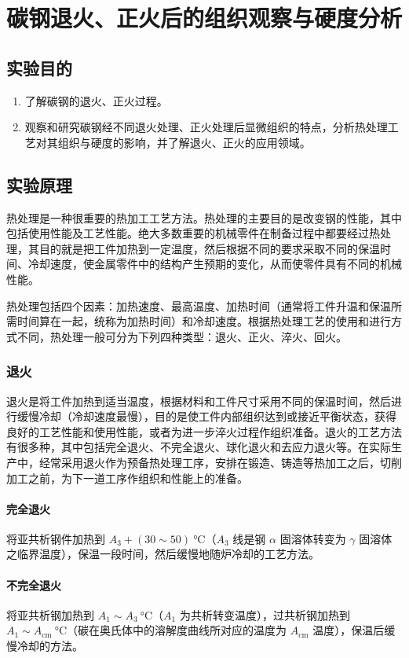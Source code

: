 \chapter{碳钢退火、正火后的组织观察与硬度分析}
\section{实验目的}
    \begin{enumerate}
        \item 了解碳钢的退火、正火过程。
        \item 观察和研究碳钢经不同退火处理、正火处理后显微组织的特点，分析热处理工艺对其组织与硬度的影响，并了解退火、正火的应用领域。
    \end{enumerate}
\section{实验原理}%
    热处理是一种很重要的热加工工艺方法。热处理的主要目的是改变钢的性能，其中包括使用性能及工艺性能。绝大多数重要的机械零件在制备过程中都要经过热处理，其目的就是把工件加热到一定温度，然后根据不同的要求采取不同的保温时间、冷却速度，使金属零件中的结构产生预期的变化，从而使零件具有不同的机械性能。\par
    热处理包括四个因素：加热速度、最高温度、加热时间（通常将工件升温和保温所需时间算在一起，统称为加热时间）和冷却速度。根据热处理工艺的使用和进行方式不同，热处理一般可分为下列四种类型：退火、正火、淬火、回火。\par
    \subsection{退火}
        退火是将工件加热到适当温度，根据材料和工件尺寸采用不同的保温时间，然后进行缓慢冷却（冷却速度最慢），目的是使工件内部组织达到或接近平衡状态，获得良好的工艺性能和使用性能，或者为进一步淬火过程作组织准备。退火的工艺方法有很多种，其中包括完全退火、不完全退火、球化退火和去应力退火等。在实际生产中，经常采用退火作为预备热处理工序，安排在锻造、铸造等热加工之后，切削加工之前，为下一道工序作组织和性能上的准备。
        \subsubsection{完全退火}
            将亚共析钢件加热到 $A_3+(30\sim 50)~\unit{\degreeCelsius}$（$A_3$ 线是钢 $\alpha$ 固溶体转变为 $\gamma$ 固溶体之临界温度），保温一段时间，然后缓慢地随炉冷却的工艺方法。
        \subsubsection{不完全退火}
            将亚共析钢加热到 $A_1 \sim A_3~\unit{\degreeCelsius}$（$A_1$ 为共析转变温度），过共析钢加热到 $A_1 \sim A_{\textrm{cm}}~\unit{\degreeCelsius}$（碳在奥氏体中的溶解度曲线所对应的温度为 $A_{\textrm{cm}}$ 温度），保温后缓慢冷却的方法。
